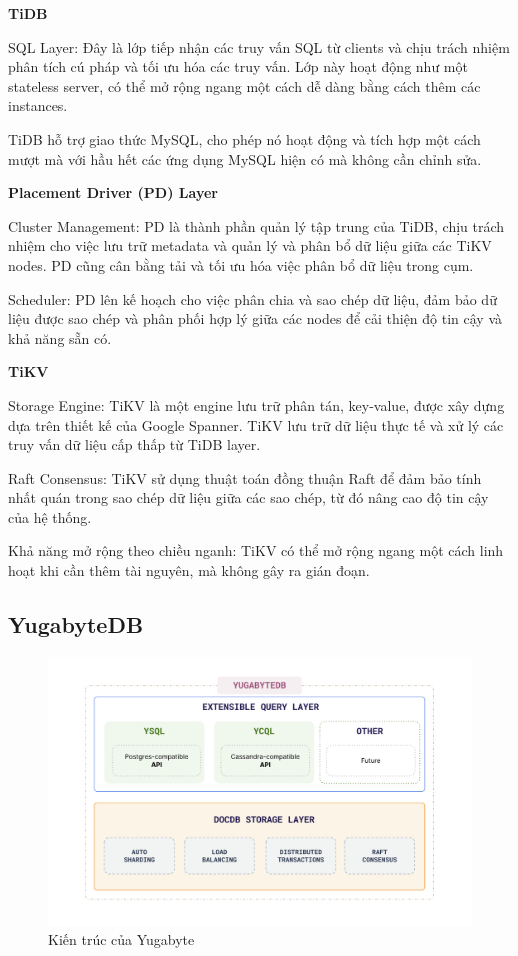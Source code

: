 \documentclass[14pt]{article}
\begin{document}
\textbf{TiDB}

SQL Layer: Đây là lớp tiếp nhận các truy vấn SQL từ clients và chịu trách nhiệm phân tích cú pháp và tối ưu hóa các truy vấn. Lớp này hoạt động như một stateless server, có thể mở rộng ngang một cách dễ dàng bằng cách thêm các instances.

TiDB hỗ trợ giao thức MySQL, cho phép nó hoạt động và tích hợp một cách mượt mà với hầu hết các ứng dụng MySQL hiện có mà không cần chỉnh sửa.

\textbf{Placement Driver (PD) Layer}

Cluster Management: PD là thành phần quản lý tập trung của TiDB, chịu trách nhiệm cho việc lưu trữ metadata và quản lý và phân bổ dữ liệu giữa các TiKV nodes. PD cũng cân bằng tải và tối ưu hóa việc phân bổ dữ liệu trong cụm.

Scheduler: PD lên kế hoạch cho việc phân chia và sao chép dữ liệu, đảm bảo dữ liệu được sao chép và phân phối hợp lý giữa các nodes để cải thiện độ tin cậy và khả năng sẵn có.


\textbf{TiKV}

Storage Engine: TiKV là một engine lưu trữ phân tán, key-value, được xây dựng dựa trên thiết kế của Google Spanner. TiKV lưu trữ dữ liệu thực tế và xử lý các truy vấn dữ liệu cấp thấp từ TiDB layer.

Raft Consensus: TiKV sử dụng thuật toán đồng thuận Raft để đảm bảo tính nhất quán trong sao chép dữ liệu giữa các sao chép, từ đó nâng cao độ tin cậy của hệ thống.

Khả năng mở rộng theo chiều nganh: TiKV có thể mở rộng ngang một cách linh hoạt khi cần thêm tài nguyên, mà không gây ra gián đoạn.

\subsection{YugabyteDB}

\begin{figure}
    \centering
    \includegraphics[width=0.6\linewidth]{images/YugaArchitecture.png}
    \caption{Kiến trúc của Yugabyte \protect\footnotemark}
    \label{fig:YugaArchitecture}
\end{figure}
\end{document}
